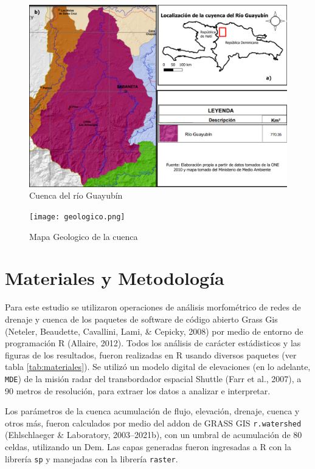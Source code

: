 \documentclass[11pt,]{article}
\begin{document}
\begin{figure}
\centering
\includegraphics[width=1.00000\textwidth]{Mapa final.png}
\caption{Cuenca del río Guayubín\label{mapacuenca}}
\end{figure}

\begin{figure}
\centering
\texttt{[image: geologico.png]}
\caption{Mapa Geologico de la cuenca\label{magecu}}
\end{figure}

\section{Materiales y Metodología}\label{materiales-y-metodologuxeda}

Para este estudio se utilizaron operaciones de análisis morfométrico de
redes de drenaje y cuenca de los paquetes de software de código abierto
Grass Gis (Neteler, Beaudette, Cavallini, Lami, \& Cepicky, 2008) por
medio de entorno de programación R (Allaire, 2012). Todos los análisis
de carácter estádisticos y las figuras de los resultados, fueron
realizadas en R usando diversos paquetes (ver tabla
\ref{tab:materiales}). Se utilizó un modelo digital de elevaciones (en
lo adelante, \texttt{MDE}) de la misión radar del transbordador espacial
Shuttle (Farr et al., 2007), a 90 metros de resolución, para extraer los
datos a analizar e interpretar.

Los parámetros de la cuenca acumulación de flujo, elevación, drenaje,
cuenca y otros más, fueron calculados por medio del addon de GRASS GIS
\texttt{r.watershed} (Ehlschlaeger \& Laboratory, 2003--2021b), con un
umbral de acumulación de 80 celdas, utilizando un Dem. Las capas
generadas fueron ingresadas a R con la librería \texttt{sp} y manejadas
con la librería \texttt{raster}.
\end{document}
